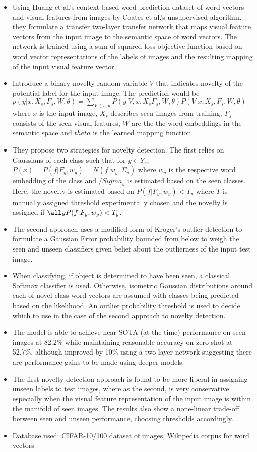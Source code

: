 \documentclass{article}
\begin{document}
\begin{itemize}
    \item Using Huang et al.'s context-based word-prediction dataset of word vectors and visual features from images by Coates et al.'s unsupervised algorithm, they formulate a transfer two-layer transfer network that maps visual feature vectors from the input image to the semantic space of word vectors. The network is trained using a sum-of-squared loss objective function based on word vector representations of the labels of images and the resulting mapping of the input visual feature vector.
    \item Introduce a binary novelty random variable $V$ that indicates novelty of the potential label for the input image. The prediction would be $p(y|x, X_s, F_s, W, \theta) = \sum_{V \in s,u} P(y|V,x,X_sF_s,W,\theta) P(V|x, X_s, F_s, W, \theta)$ where $x$ is the input image, $X_s$ describes seen images from training, $F_s$ consists of the seen visual features, $W$ are the the word embeddings in the semantic space and $theta$ is the learned mapping function.
    \item They propose two strategies for novelty detection. The first relies on Gaussians of each class such that for $y \in Y_s$, $P(x) = P(f|F_y, w_y) = N(f|w_y, \Sigma_y)$ where $w_y$ is the respective word embedding of the class and $/Sigma_y$ is estimated based on the seen classes. Here, the novelty is estimated based on $P(f|F_y,w_y) < T_y$ where $T$ is manually assigned threshold experimentally chosen and the novelty is assigned if $\all y P(f|F_y,w_y) < T_y$. 
    \item The second approach uses a modified form of Kroger's outlier detection to formulate a Gaussian Error probability bounded from below to weigh the seen and unseen classifiers given belief about the outlierness of the input test image.
    \item When classifying, if object is determined to have been seen, a classical Softmax classifier is used. Otherwise, isometric Gaussian distributions around each of novel class word vectors are assumed with classes being predicted based on the likelihood. An outlier probability threshold is used to decide which to use in the case of the second approach to novelty detection.
    \item The model is able to achieve near SOTA (at the time) performance on seen images at 82.2\% while maintaining reasonable accuracy on zero-shot at 52.7\%, although improved by 10\% using a two layer network suggesting there are performance gains to be made using deeper models.
    \item The first novelty detection approach is found to be more liberal in assigning unseen labels to test images, where as the second, is very conservative especially when the visual feature representation of the input image is within the manifold of seen images. The results also show a none-linear trade-off between seen and unseen performance, choosing thresholds accordingly.
    \item Database used: CIFAR-10/100 dataset of images, Wikipedia corpus for word vectors
\end{itemize}
\end{document}
